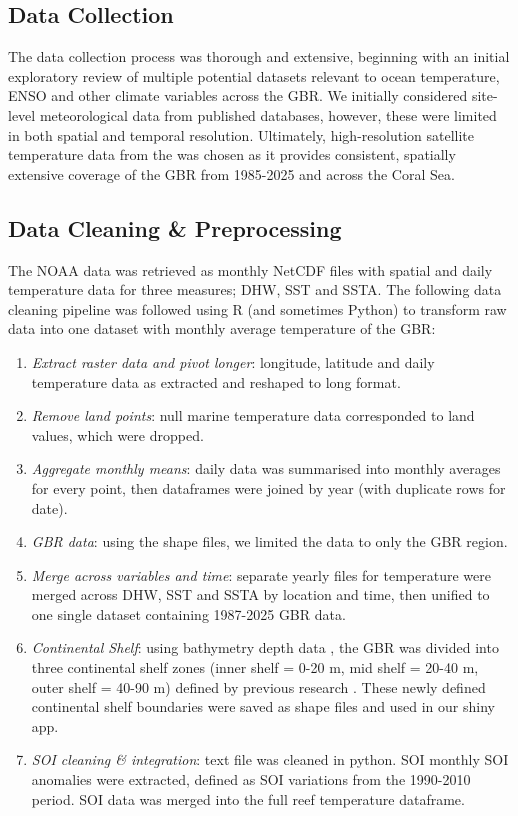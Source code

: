 \documentclass[letterpaper,9pt,twocolumn,twoside,]{pinp}
\begin{document}
\subsection{Data Collection}\label{data-collection}

The data collection process was thorough and extensive, beginning with
an initial exploratory review of multiple potential datasets relevant to
ocean temperature, ENSO and other climate variables across the GBR. We
initially considered site-level meteorological data from published
databases, however, these were limited in both spatial and temporal
resolution. Ultimately, high-resolution satellite temperature data from
the \citet{NOAA_CRW2024} was chosen as it provides consistent, spatially
extensive coverage of the GBR from 1985-2025 and across the Coral Sea.

\subsection{Data Cleaning \&
Preprocessing}\label{data-cleaning-preprocessing}

The NOAA data was retrieved as monthly NetCDF files with spatial and
daily temperature data for three measures; DHW, SST and SSTA. The
following data cleaning pipeline was followed using R (and sometimes
Python) to transform raw data into one dataset with monthly average
temperature of the GBR:

\begin{enumerate}
\def\labelenumi{\arabic{enumi}.}
\item
  \emph{Extract raster data and pivot longer}: longitude, latitude and
  daily temperature data as extracted and reshaped to long format.
\item
  \emph{Remove land points}: null marine temperature data corresponded
  to land values, which were dropped.
\item
  \emph{Aggregate monthly means}: daily data was summarised into monthly
  averages for every point, then dataframes were joined by year (with
  duplicate rows for date).
\item
  \emph{GBR data}: using the \citet{GBRMPA2017} shape files, we limited
  the data to only the GBR region.
\item
  \emph{Merge across variables and time}: separate yearly files for
  temperature were merged across DHW, SST and SSTA by location and time,
  then unified to one single dataset containing 1987-2025 GBR data.
\item
  \emph{Continental Shelf}: using bathymetry depth data
  \citet{GA_HIGHRES_BATHY}, the GBR was divided into three continental
  shelf zones (inner shelf = 0-20 m, mid shelf = 20-40 m, outer shelf =
  40-90 m) defined by previous research \citet{Belperio1983}
  \citet{Maxwell1968}. These newly defined continental shelf boundaries
  were saved as shape files and used in our shiny app.
\item
  \emph{SOI cleaning \& integration}: \citet{NOAA_SOI2025} text file was
  cleaned in python. SOI monthly SOI anomalies were extracted, defined
  as SOI variations from the 1990-2010 period. SOI data was merged into
  the full reef temperature dataframe.
\end{enumerate}
\end{document}
